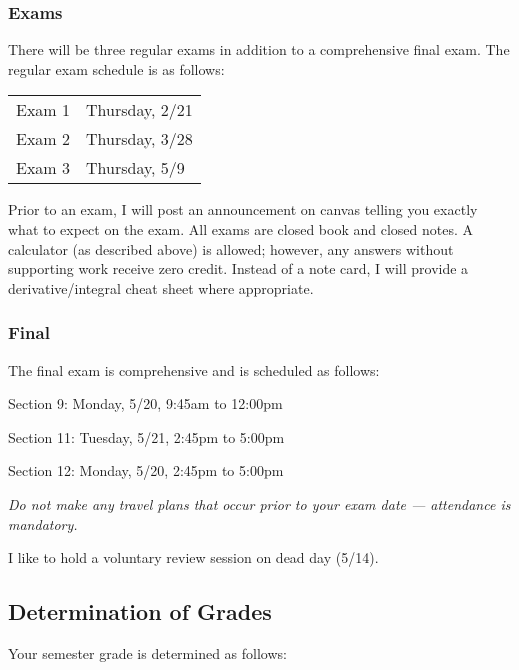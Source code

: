 \documentclass[letterpaper,12pt,fleqn]{article}
\begin{document}
\subsubsection*{Exams}

There will be three regular exams in addition to a comprehensive final exam.  The regular exam schedule is as follows:

\bigskip

\begin{tabular}{ll}
  Exam 1 & Thursday, 2/21 \\
  Exam 2 & Thursday, 3/28 \\
  Exam 3 & Thursday, 5/9
\end{tabular}
  
\bigskip

Prior to an exam, I will post an announcement on canvas telling you exactly what to expect on the exam.  All exams are closed
book and closed notes.  A calculator (as described above) is allowed; however, any answers without supporting work receive
zero credit.  Instead of a note card, I will provide a derivative/integral cheat sheet where appropriate.

\subsubsection*{Final}

The final exam is comprehensive and is scheduled as follows:
\begin{description}
  \bfseries
\item{Section 9:} Monday, 5/20, 9:45am to 12:00pm
\item{Section 11:} Tuesday, 5/21, 2:45pm to 5:00pm
\item{Section 12:} Monday, 5/20, 2:45pm to 5:00pm
\end{description}
\emph{Do not make any travel plans that occur prior to your exam date --- attendance is mandatory.}

I like to hold a voluntary review session on dead day (5/14).

\subsection*{Determination of Grades}

Your semester grade is determined as follows:

\bigskip
\end{document}
